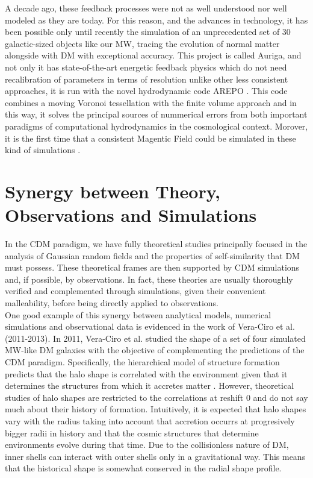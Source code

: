  A decade ago, these feedback processes were not as well understood nor well modeled as they are today. For this reason, and the advances in technology, it has been possible only until recently the simulation of an unprecedented set of 30 galactic-sized objects like our MW, tracing the evolution of normal matter alongside with DM with exceptional accuracy. This project is called Auriga, \cite{Auriga} and not only it has state-of-the-art energetic feedback physics which do not need recalibration of parameters in terms of resolution unlike other less consistent approaches, it is run with the novel hydrodynamic code AREPO
\cite{Arepo}. This code combines a moving Voronoi tessellation with the
finite volume approach and in this way, it solves the principal sources of nummerical errors from both important paradigms of computational hydrodynamics in the cosmological context. Morover, it is the first time that a consistent Magentic Field could be simulated in these kind of simulations \cite{parkmorr}.\\
 

\section{Synergy between Theory, Observations and Simulations }
In the CDM paradigm, we have fully theoretical studies \cite{Bardeen et al. 1986,Schechter} principally focused in the analysis of Gaussian random fields and the properties of self-similarity that DM must possess. 
These theoretical frames are then supported by CDM simulations \cite{Cualquier estudio de CDM hace referencia a esos pilares} and, if possible, by observations. 
In fact, these theories are usually thoroughly verified and complemented through simulations, given their convenient malleability, before being directly applied to observations.\\%

One good example of this synergy between analytical models, numerical simulations and observational data is evidenced in the work of Vera-Ciro et al. (2011-2013). In 2011, Vera-Ciro et al. studied the shape of a set of four simulated MW-like DM galaxies with the objective of complementing the predictions of the CDM paradigm. Specifically, the hierarchical model of structure formation predicts that the halo shape is correlated with the environment given that it determines the structures from which it accretes matter \cite{referencias sobre relacion entre forma y entorno}. However, theoretical studies of halo shapes are restricted to the correlations at reshift 0 and do not say much about their history of formation. Intuitively, it is expected that halo shapes vary with the radius taking into account that accretion occurrs at progresively bigger radii in history and that the cosmic structures that determine environments evolve during that time. Due to the collisionless nature of DM, inner shells can interact with outer shells only in a gravitational way. This means that the historical shape is somewhat conserved in the radial shape profile.\\

